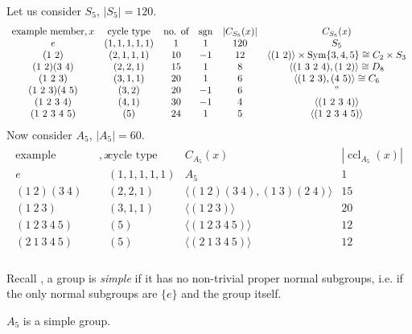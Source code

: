 Let us consider $S_5$, $|S_5| = 120$.
\begin{align*}
    \begin{array}{cccccc}
        \text{example member}, x & \text{cycle type} & \text{no. of} & \operatorname{sgn} & |C_{S_5}(x)| & C_{S_5}(x) \\
        e & (1, 1, 1, 1, 1) & 1 & 1 & 120 & S_5 \\
        (1\ 2) & (2, 1, 1, 1) & 10 & -1 & 12 & \langle (1\ 2) \rangle \times \operatorname{Sym}\{3, 4, 5\} \cong C_2 \times S_3 \\
        (1\ 2) (3\ 4) & (2, 2, 1) & 15 & 1 & 8 & \langle (1\ 3\ 2\ 4), (1\ 2) \rangle \cong D_8 \\
        (1\ 2\ 3) & (3, 1, 1) & 20 & 1 & 6 & \langle (1\ 2\ 3), (4\ 5) \rangle \cong C_6 \\
        (1\ 2\ 3) (4\ 5) & (3, 2) & 20 & -1 & 6 & " \\
        (1\ 2\ 3\ 4) & (4, 1) & 30 & -1 & 4 & \langle (1\ 2\ 3\ 4) \rangle \\
        (1\ 2\ 3\ 4\ 5) & (5) & 24 & 1 & 5 & \langle (1\ 2\ 3\ 4\ 5) \rangle
    \end{array}  
\end{align*} 
Now consider $A_5$, $|A_5| = 60$.
\begin{align*}
    \begin{array}{ccccc}
        \text{example member}, x & \text{cycle type} & C_{A_5}(x) & |\operatorname{ccl}_{A_5}(x)| \\
        e & (1, 1, 1, 1, 1) & A_5 & 1\\
        (1\ 2) (3\ 4) & (2, 2, 1) & \langle (1\ 2) (3\ 4), (1\ 3) (2\ 4)\rangle & 15\\
        (1\ 2\ 3) & (3, 1, 1) & \langle (1\ 2\ 3) \rangle & 20 \\
        (1\ 2\ 3\ 4\ 5) & (5) & \langle (1\ 2\ 3\ 4\ 5) \rangle & 12 \\
        (2\ 1\ 3\ 4\ 5) & (5) & \langle (2\ 1\ 3\ 4\ 5) \rangle & 12 \\
    \end{array}  
\end{align*} 

Recall , a group is \emph{simple} if it has no non-trivial proper normal subgroups, i.e. if the only normal subgroups are $\{e\}$ and the group itself. 

\begin{theorem} \label{thm:10}
    $A_5$ is a simple group.
\end{theorem} 

